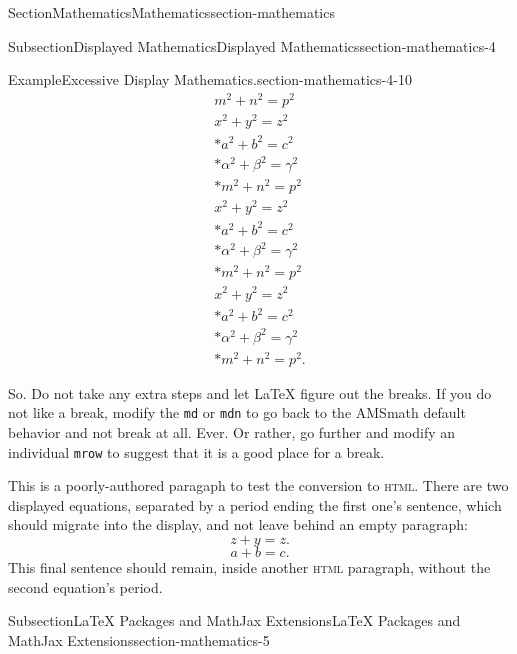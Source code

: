 \documentclass[twoside,10pt,]{article}
\newcommand{\mono}[1]{\texttt{#1}}
\newcommand{\initialism}[1]{\textsc{\MakeLowercase{#1}}}
\numberwithin{equation}{section}
\begin{document}
\begin{sectionptx}{Section}{Mathematics}{}{Mathematics}{}{}{section-mathematics}
\begin{subsectionptx}{Subsection}{Displayed Mathematics}{}{Displayed Mathematics}{}{}{section-mathematics-4}
\begin{example}{Example}{Excessive Display Mathematics.}{section-mathematics-4-10}
\begin{gather}
m^2+n^2=p^2\label{section-mathematics-4-10-3-2-36}\\
x^2+y^2=z^2\label{section-mathematics-4-10-3-2-37}\\*
a^2+b^2=c^2\label{section-mathematics-4-10-3-2-38}\\*
\alpha^2+\beta^2=\gamma^2\label{section-mathematics-4-10-3-2-39}\\*
m^2+n^2=p^2\label{section-mathematics-4-10-3-2-40}\\
x^2+y^2=z^2\label{section-mathematics-4-10-3-2-41}\\*
a^2+b^2=c^2\label{section-mathematics-4-10-3-2-42}\\*
\alpha^2+\beta^2=\gamma^2\label{section-mathematics-4-10-3-2-43}\\*
m^2+n^2=p^2\label{section-mathematics-4-10-3-2-44}\\
x^2+y^2=z^2\label{section-mathematics-4-10-3-2-45}\\*
a^2+b^2=c^2\label{section-mathematics-4-10-3-2-46}\\*
\alpha^2+\beta^2=\gamma^2\label{section-mathematics-4-10-3-2-47}\\*
m^2+n^2=p^2\text{.}\label{section-mathematics-4-10-3-2-48}
\end{gather}
%
\par
So.  Do not take any extra steps and let \LaTeX{} figure out the breaks.  If you do not like a break, modify the \mono{md} or \mono{mdn} to go back to the AMSmath default behavior and not break at all.  Ever.  Or rather, go further and modify an individual \mono{mrow} to suggest that it is a good place for a break.%
\end{example}
This is a poorly-authored paragaph to test the conversion to \initialism{HTML}.  There are two displayed equations, separated by a period ending the first one's sentence, which should migrate into the display, and not leave behind an empty paragraph:%
\begin{equation*}
z+y = z\text{.}
\end{equation*}
%
\begin{equation*}
a + b = c\text{.}
\end{equation*}
This final sentence should remain, inside another \initialism{HTML} paragraph, without the second equation's period.%
\end{subsectionptx}
%
%
\typeout{************************************************}
\typeout{************************************************}
%
\begin{subsectionptx}{Subsection}{\LaTeX{} Packages and MathJax Extensions}{}{\LaTeX{} Packages and MathJax Extensions}{}{}{section-mathematics-5}

\end{subsectionptx}
\end{sectionptx}
\end{document}
